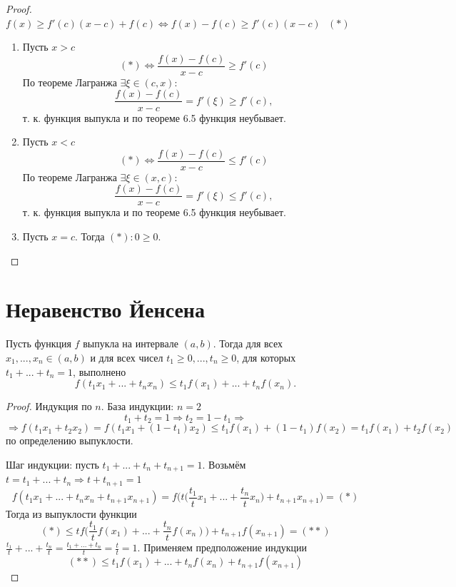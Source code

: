     \begin{proof}
    	$f(x) \geqslant f'(c)(x - c) + f(c) \Leftrightarrow f(x) - f(c) \geqslant f'(c)(x - c) \text{ } (*)$
    	\begin{enumerate}
    		\item Пусть $x > c$
    		\[ (*) \Leftrightarrow \frac{f(x) - f(c)}{x - c} \geqslant f'(c) \]
    		По теореме Лагранжа $\exists \xi \in (c, x) :$
    		\[ \frac{f(x) - f(c)}{x - c} = f'(\xi) \geqslant f'(c), \]
    		т. к. функция выпукла и по теореме 6.5 функция неубывает.
    		\item Пусть $x < c$
    		\[ (*) \Leftrightarrow \frac{f(x) - f(c)}{x - c} \leqslant f'(c) \]
    		По теореме Лагранжа $\exists \xi \in (x, c) :$
    		\[ \frac{f(x) - f(c)}{x - c} = f'(\xi) \leqslant f'(c), \]
    		т. к. функция выпукла и по теореме 6.5 функция неубывает.
    		\item Пусть $x = c$. Тогда $(*): 0 \geqslant 0$.
    	\end{enumerate}
    \end{proof}
    
    \section{Неравенство Йенсена}
    
    \begin{theorem}
    	Пусть функция $f$ выпукла на интервале $(a, b)$. Тогда для всех $x_1, ..., x_n \in (a, b)$ и для всех чисел $t_1 \geqslant 0, ..., t_n \geqslant 0$, для
    	которых $t_1 + ... + t_n = 1$, выполнено
    	\[ f(t_1 x_1 + ... + t_n x_n) \leqslant t_1 f(x_1) + ... + t_n f(x_n). \]
    \end{theorem}
    
    \begin{proof}
    	Индукция по $n$. База индукции: $n = 2$
    	\[ t_1 + t_2 = 1 \Rightarrow t_2 = 1 - t_1 \Rightarrow \]
    	\[ \Rightarrow f(t_1 x_1 + t_2 x_2) = f(t_1 x_1 + (1 - t_1) x_2) \leqslant t_1 f(x_1) + (1 - t_1) f(x_2) = t_1 f(x_1) + t_2 f(x_2) \]
    	по определению выпуклости.
    	
    	Шаг индукции: пусть $t_1 + ... + t_n + t_{n + 1} = 1$. Возьмём $t = t_1 + ... + t_n \Rightarrow t + t_{n + 1} = 1$
    	\[ f(t_1 x_1 + ... + t_n x_n + t_{n + 1} x_{n + 1}) = f\bigg(t\bigg(\frac{t_1}{t} x_1 + ... + \frac{t_n}{t} x_n\bigg) + t_{n + 1} x_{n + 1}\bigg) = (*) \]
    	Тогда из выпуклости функции
    	\[ (*) \leqslant t f\bigg(\frac{t_1}{t} f(x_1) + ... + \frac{t_n}{t} f(x_n)\bigg) + t_{n + 1} f(x_{n + 1}) = (**)  \]
    	$\frac{t_1}{t} + ... + \frac{t_n}{t} = \frac{t_1 + ... + t_n}{t} = \frac{t}{t} = 1$. Применяем предположение индукции
    	\[ (**) \leqslant t_1 f(x_1) + ... + t_n f(x_n) + t_{n + 1} f(x_{n + 1}) \]
    \end{proof}
    
